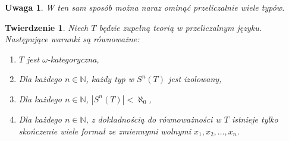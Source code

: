 \documentclass{article}
\newcommand{\N}{\mathbb{N}}
\theoremstyle{plain}
\newtheorem{tw}[thm]{Twierdzenie}
\newtheorem{uw}[thm]{Uwaga}
\theoremstyle{definition}
\theoremstyle{remark}
\begin{document}
\begin{uw}
	 W ten sam sposób można naraz ominąć przeliczalnie wiele typów.
\end{uw}

\begin{tw}
	 Niech $T$ będzie zupełną teorią w przeliczalnym języku.
	 Następujące warunki są równoważne:
	 \begin{enumerate}
		 \item $T$ jest $\omega$-kategoryczna,
		 \item Dla każdego $n \in \N$, każdy typ w $S^n(T)$ jest izolowany,
		 \item Dla każdego $n \in \N$, $|S^n(T)| < \aleph_0$,
		 \item Dla każdego $n \in \N$, z dokładnością do równoważności w $T$ istnieje tylko skończenie wiele formuł ze zmiennymi wolnymi $x_1, x_2, \ldots, x_n$.
	 \end{enumerate}
\end{tw}
\end{document}
